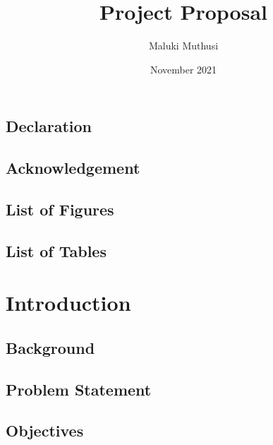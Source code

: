 \documentclass{report}
\title{Project Proposal}
\author{Maluki Muthusi}
\date{November 2021}
\begin{document}


\section{Declaration}

\newpage

\section{Acknowledgement}

\newpage



\renewcommand*\contentsname{\section{Table of Contents}}


\section{List of Figures}

\section{List of Tables}


\chapter{Introduction}


\section{Background}


\section{Problem Statement}


\section{Objectives}

\end{document}
